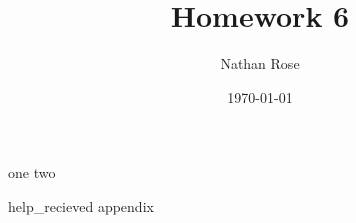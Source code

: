 \documentclass[11pt]{article}
\title{Homework 6}
\author{Nathan Rose}
\date{\today}
\begin{document}
\maketitle
\begin{enumerate}
  {one}
  {two}
\end{enumerate}
{help_recieved}
{appendix}
\end{document}

